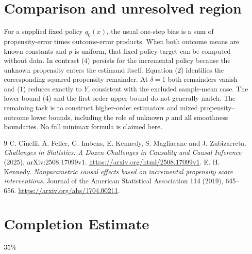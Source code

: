 \documentclass[11pt]{article}
\theoremstyle{definition}
\begin{document}
\section*{Comparison and unresolved region}
For a supplied fixed policy $q_0(x)$, the usual one-step bias is a sum of
propensity-error times outcome-error products. When both outcome means
are known constants and $p$ is uniform, that fixed-policy target can be
computed without data. In contrast (4) persists for the incremental
policy because the unknown propensity enters the estimand itself.
Equation (2) identifies the corresponding squared-propensity remainder.
At $\delta=1$ both remainders vanish and (1) reduces exactly to $Y$,
consistent with the excluded sample-mean case.
The lower bound (4) and the first-order upper bound do not generally match.
The remaining task is to construct higher-order estimators and mixed
propensity--outcome lower bounds, including the role of unknown $p$ and
all smoothness boundaries. No full minimax formula is claimed here.

\begin{thebibliography}{9}
 C. Cinelli, A. Feller, G. Imbens, E. Kennedy, S. Magliacane and J. Zubizarreta.
\emph{Challenges in Statistics: A Dozen Challenges in Causality and Causal Inference} (2025), arXiv:2508.17099v1.
\url{https://arxiv.org/html/2508.17099v1}.
 E. H. Kennedy.
\emph{Nonparametric causal effects based on incremental propensity score interventions}.
Journal of the American Statistical Association 114 (2019), 645--656.
\url{https://arxiv.org/abs/1704.00211}.
\end{thebibliography}
\section{Completion Estimate}
35\%
\end{document}
